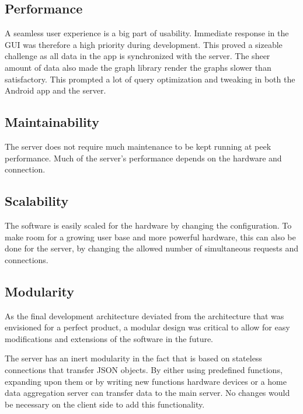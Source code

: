 \subsection{Performance}
A seamless user experience is a big part of usability. Immediate response in the GUI was therefore a high priority during development. This proved a sizeable challenge as all data in the app is synchronized with the server. 
The sheer amount of data also made the graph library render the graphs slower than satisfactory. This prompted a lot of query optimization and tweaking 
in both the Android app and the server. 

\subsection{Maintainability}
The server does not require much maintenance to be kept running at peek performance. Much of the server's performance depends on the hardware and  connection. 

\subsection{Scalability}
The software is easily scaled for the hardware by changing the configuration.  To make room for a growing user base and more powerful hardware, this can also be done for the server, by changing the allowed number of simultaneous requests and connections.


\subsection{Modularity}
\label{sec:modularity}
As the final development architecture deviated from the architecture that was envisioned for a perfect product, a modular design was critical to allow for easy modifications and 
extensions of the software in the future. 

The server has an inert  modularity in the fact that is based on stateless connections that transfer JSON objects.  By either using predefined functions, expanding upon them or by writing new functions hardware devices or a home data aggregation server can transfer data to the main server. No changes would be necessary on the client side to add this functionality. 
